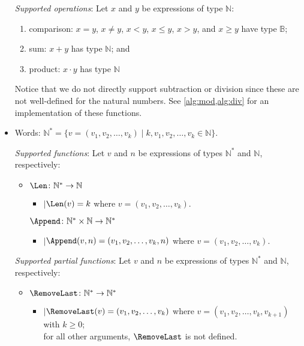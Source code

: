 \documentclass[11pt,a4paper,reqno]{amsart}
\theoremstyle{plain}
\theoremstyle{definition}
\theoremstyle{definition}
\renewcommand\leq\leqslant
\renewcommand\geq\geqslant
\newenvironment{indentline}{\begin{itemize}[leftmargin=1em]\item[]}{\end{itemize}}
\newcommand\hl[1]{\colorbox{gray!10}{#1}}
\begin{document}
\begin{itemize}[leftmargin=2em]
	      \smallskip
	      \noindent
	      \textit{Supported operations}:
	      Let $x$ and $y$ be expressions of type $\mathbb N$:
	      \begin{enumerate}
		      \item comparison:
		            \hl{$x = y$},
		            \hl{$x \neq y$},
		            \hl{$x < y$},
		            \hl{$x \leq y$},
		            \hl{$x > y$}, and
		            \hl{$x \geq y$}
		            have type $\mathbb B$;
		      \item sum: \hl{$x+y$} has type $\mathbb N$; and
		      \item product: \hl{$x\cdot y$} has type $\mathbb N$
	      \end{enumerate}
	      Notice that we do not directly support subtraction or division since these are not well-defined for the natural numbers.
	      See \cref{alg:mod,alg:div} for an implementation of these functions.

	      \medskip

	\item Words: $\mathbb N^* = \{v = (v_1,v_2,\ldots,v_k) \mid k,v_1,v_2,\ldots,v_k\in \mathbb N \}$.

	      \smallskip
	      \noindent
	      \textit{Supported functions}:
	      Let $v$ and $n$ be expressions of types $\mathbb N^*$ and $\mathbb N$, respectively:
	      \begin{indentline}
		      $\Len\colon \mathbb N^*\to\mathbb N$
		      \begin{indentline}
			      $\mid$\quad $\Len(v) = k$ where $v = (v_1,v_2,\ldots,v_k)$.
		      \end{indentline}

		      \smallskip
		      \noindent
		      $\Append\colon \mathbb N^* \times \mathbb N \to \mathbb N^*$
		      \begin{indentline}
			      $\mid$\quad $\Append(v,n) = (v_1,v_2,\ldots,v_k,n)$ where $v = (v_1,v_2,\ldots,v_k)$.
		      \end{indentline}
	      \end{indentline}

	      \smallskip
	      \noindent
	      \textit{Supported partial functions}:
	      Let $v$ and $n$ be expressions of types $\mathbb N^*$ and $\mathbb N$, respectively:
	      \begin{indentline}
		      \smallskip
		      \noindent
		      $\RemoveLast\colon \mathbb N^*\to \mathbb N^*$
		      \begin{indentline}
			      $\mid$\quad $\RemoveLast(v) = (v_1,v_2,\ldots,v_{k})$ where $v = (v_1,v_2,\ldots,v_k,v_{k+1})$ with $k\geq 0$;\\
			      \phantom{$\mid$\quad }for all other arguments, $\RemoveLast$ is not defined.
		      \end{indentline}


\end{indentline}
\end{itemize}
\end{document}
